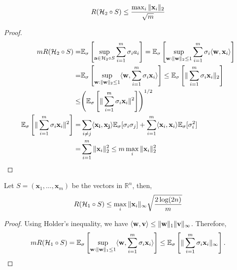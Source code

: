 \begin{lemma}
    \begin{equation}
        R( \mathcal{H}_2 \circ S ) \le \frac{\max_i \Arrowvert \mathbf{x}_i \Arrowvert_2}{\sqrt{m}}
    \end{equation}
    \begin{proof}
        \begin{align*}
            mR( \mathcal{H}_2 \circ S) =& \mathbb{E}_\sigma \left[ \sup_{\mathbf{a} \in \mathcal{H}_2 \circ S} \sum^{m}_{i=1} \sigma_i a_i \right] = \mathbb{E}_\sigma \left[ \sup_{\mathbf{w}:\Arrowvert \mathbf{w} \Arrowvert_2 \le 1} \sum^{m}_{i=1} \sigma_i \langle \mathbf{w}, \mathbf{x}_i \rangle \right]\\
            =& \mathbb{E}_\sigma \left[ \sup_{\mathbf{w}:\Arrowvert \mathbf{w} \Arrowvert_2 \le 1} \langle \mathbf{w}, \sum^{m}_{i=1} \sigma_i \mathbf{x}_i \rangle \right]
            \le \mathbb{E}_\sigma \left[ \Arrowvert \sum^{m}_{i=1} \sigma_i \mathbf{x}_i \Arrowvert_2 \right]\\
        \le& {\left( \mathbb{E}_\sigma \left[ \Arrowvert \sum^{m}_{i=1} \sigma_i \mathbf{x}_i \Arrowvert^2 \right] \right)}^{1/2} \\
        \mathbb{E}_\sigma \left[ \Arrowvert \sum^{m}_{i=1} \sigma_i \mathbf{x}_i \Arrowvert^2 \right]
        =& \sum^{}_{i\ne j} \langle \mathbf{x_i}, \mathbf{x_j} \rangle \mathbb{E}_\sigma[\sigma_i \sigma_j]
        + \sum^{m}_{i=1} \langle \mathbf{x}_i, \mathbf{x}_i \rangle \mathbb{E}_\sigma[\sigma_i^2]\\
        =& \sum^{m}_{i=1} \Arrowvert \mathbf{x}_i \Arrowvert^2_2 \le m \max_i \Arrowvert \mathbf{x}_i \Arrowvert^2_2
        \end{align*}
    \end{proof}
\end{lemma}

\begin{lemma}
    Let $ S = ( \mathbf{x}_1, \ldots, \mathbf{x}_m ) $ be the vectors in $ \mathbb{R}^n $, then,
    \begin{equation}
        R( \mathcal{H}_1 \circ S) \le \max_i \Arrowvert \mathbf{x}_i \Arrowvert_\infty
        \sqrt{\frac{2\log(2n)}{m}}
    \end{equation}
    \begin{proof}
        Using Holder's inequality, we have $ \langle \mathbf{w}, \mathbf{v} \rangle \le \Arrowvert \mathbf{w} \Arrowvert_1 \Arrowvert \mathbf{v} \Arrowvert_\infty$. Therefore,
        \begin{align*}
            mR( \mathcal{H}_1 \circ S )
            = \mathbb{E}_\sigma \left[ \sup_{\mathbf{w}:\Arrowvert \mathbf{w} \Arrowvert_1 \le 1} \langle \mathbf{w}, \sum^{m}_{i=1} \sigma_i \mathbf{x}_i \rangle \right]
            \le \mathbb{E}_\sigma \left[ \Arrowvert \sum^{m}_{i=1} \sigma_i \mathbf{x}_i \Arrowvert_\infty \right].
        \end{align*}
    \end{proof}
\end{lemma}

